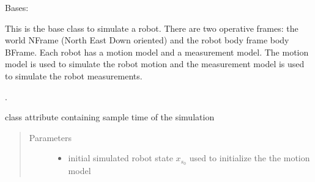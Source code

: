 \documentclass[letterpaper,10pt,english]{sphinxmanual}
\begin{document}
\begin{fulllineitems}
\label{\detokenize{robot_simulation:SimulatedRobot.SimulatedRobot}}
\sphinxAtStartPar
Bases: 

\sphinxAtStartPar
This is the base class to simulate a robot. There are two operative frames: the world  N\sphinxhyphen{}Frame (North East Down oriented) and the robot body frame body B\sphinxhyphen{}Frame.
Each robot has a motion model and a measurement model. The motion model is used to simulate the robot motion and the measurement model is used to simulate the robot measurements.

\sphinxAtStartPar
{} .

\begin{fulllineitems}
\label{\detokenize{robot_simulation:SimulatedRobot.SimulatedRobot.dt}}
\sphinxAtStartPar
class attribute containing sample time of the simulation

\end{fulllineitems}


\begin{fulllineitems}
\label{\detokenize{robot_simulation:SimulatedRobot.SimulatedRobot.__init__}}\begin{quote}\begin{description}
\item[{Parameters}] \leavevmode\begin{itemize}
\item {} 
\sphinxAtStartPar
{} \textendash{} initial simulated robot state \(x_{s_0}\) used to initialize the the motion model


\end{itemize}
\end{description}
\end{quote}
\end{fulllineitems}
\end{fulllineitems}
\end{document}
